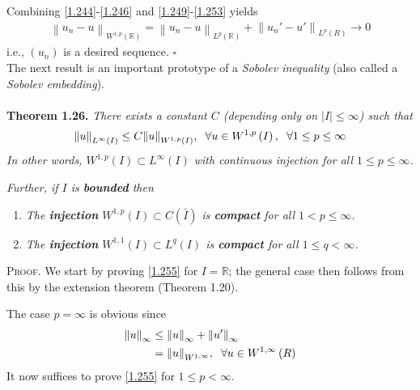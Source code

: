 \documentclass[a4paper,oneside]{book}
\numberwithin{equation}{chapter}
\begin{document}
Combining \eqref{1.244}-\eqref{1.246} and \eqref{1.249}-\eqref{1.253} yields
\begin{align}
{\left\| {{u_n} - u} \right\|_{{W^{1,p}}\left( \mathbb{R} \right)}} = {\left\| {{u_n} - u} \right\|_{{L^p}\left( \mathbb{R} \right)}} + {\left\| {{u_n}' - u'} \right\|_{{L^p}\left( R \right)}} \to 0
\end{align}
i.e., $\left(u_n\right)$ is a desired sequence. \hfill $\square$\\

The next result is an important prototype of a \textit{Sobolev inequality} (also called a \textit{Sobolev embedding}).\\
\\
\textbf{Theorem 1.26.} \textit{There exists a constant $C$ (depending only on $\left| I \right| \le \infty $) such that}
\begin{align}
\label{1.255}
{\left\| u \right\|_{{L^\infty }\left( I \right)}} \le C{\left\| u \right\|_{{W^{1,p}}\left( I \right)}},\hspace{0.2cm}\forall u \in {W^{1,p}}\left( I \right),\hspace{0.2cm}\forall 1 \le p \le \infty 
\end{align}
\textit{In other words, ${W^{1,p}}\left( I \right) \subset {L^\infty }\left( I \right)$ with continuous injection for all $1\le p\le \infty$.}

\textit{Further, if $I$ is \textbf{bounded} then}
\begin{enumerate}
\item \textit{The \textbf{injection} ${W^{1,p}}\left( I \right) \subset C\left( {\bar I} \right)$ is \textbf{compact} for all $1<p\le \infty$.}
\item \textit{The \textbf{injection} ${W^{1,1}}\left( I \right) \subset {L^q}\left( I \right)$ is \textbf{compact} for all $1\le q< \infty$.}
\end{enumerate}
\textsc{Proof.} We start by proving \eqref{1.255} for $I=\mathbb{R}$; the general case then follows from this by the extension theorem (Theorem 1.20). 

The case $p=\infty$ is obvious since
\begin{align}
{\left\| u \right\|_\infty } &\le {\left\| u \right\|_\infty } + {\left\| {u'} \right\|_\infty }\\
 &= {\left\| u \right\|_{{W^{1,\infty }}}},\hspace{0.2cm}\forall u \in {W^{1,\infty }}\left( R \right)
\end{align}
It now suffices to prove \eqref{1.255} for $1\le p<\infty$.  
\end{document}
